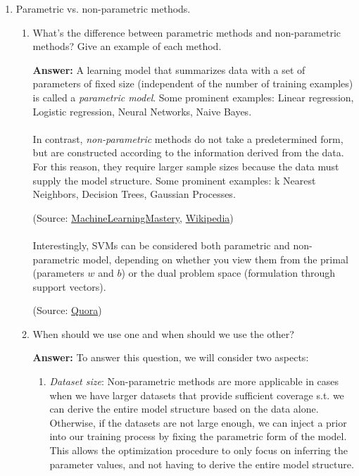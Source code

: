 \documentclass{article}
\newenvironment{QandA}{\begin{enumerate}[label=\arabic*.]}{\end{enumerate}}
\newenvironment{InnerQandA}{\begin{enumerate}[label=\roman*.]}{\end{enumerate}}
\newenvironment{ListAlph}{\begin{enumerate}[label=(\alph*)]}{\end{enumerate}}
\newenvironment{answer}{\par\normalfont \textbf{Answer:}}{}
\begin{document}
\begin{QandA}
    \item Parametric vs. non-parametric methods.
    \begin{InnerQandA}
        \item What’s the difference between parametric methods and non-parametric methods? Give an example of each method.
        \begin{answer}
            A learning model that summarizes data with a set of parameters of fixed size (independent of the number of training examples) is called a \textit{parametric model}. Some prominent examples: Linear regression, Logistic regression, Neural Networks, Naive Bayes. \\\\
            In contrast, \textit{non-parametric} methods do not take a predetermined form, but are constructed according to the information derived from the data. For this reason, they require larger sample sizes because the data must supply the model structure. Some prominent examples: k Nearest Neighbors, Decision Trees, Gaussian Processes.

            (Source: \href{https://machinelearningmastery.com/parametric-and-nonparametric-machine-learning-algorithms/}{MachineLearningMastery}, \href{https://en.wikipedia.org/wiki/Nonparametric_regression}{Wikipedia}) \\\\
            Interestingly, SVMs can be considered both parametric and non-parametric model, depending on whether you view them from the primal (parameters $w$ and $b$) or the dual problem space (formulation through support vectors). 

            (Source: \href{https://www.quora.com/Do-Support-Vector-Machines-come-under-parametric-or-non-parametric-models-and-why}{Quora})
        \end{answer}

        \item When should we use one and when should we use the other?
        \begin{answer}
            To answer this question, we will consider two aspects:
            \begin{ListAlph}
                \item \textit{Dataset size}: Non-parametric methods are more applicable in cases when we have larger datasets that provide sufficient coverage s.t. we can derive the entire model structure based on the data alone. Otherwise, if the datasets are not large enough, we can inject a prior into our training process by fixing the parametric form of the model. This allows the optimization procedure to only focus on inferring the parameter values, and not having to derive the entire model structure.


\end{ListAlph}
\end{answer}
\end{InnerQandA}
\end{QandA}
\end{document}
